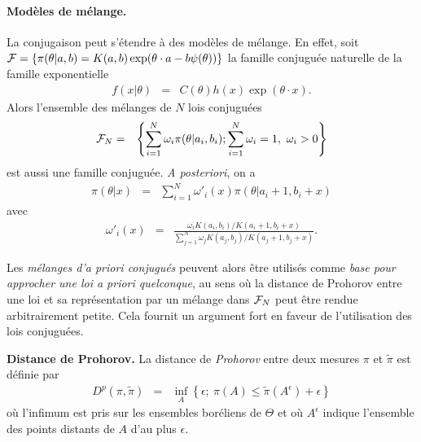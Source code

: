 \if{} \vspace{1cm} 
\fi
\vspace{0.5cm}

\paragraph{\bf Modèles de mélange.} La conjugaison peut s'étendre à des modèles de mélange. En effet, soit ${\cal{F}}=\{\pi(\theta|a,b)=K(a,b)\exp(\theta\cdot a - b\psi(\theta))\}$  la famille conjuguée naturelle de la famille exponentielle
\begin{eqnarray*}
f(x|\theta) & = & C(\theta)h(x)\exp(\theta\cdot x).
\end{eqnarray*}
Alors l'ensemble des mélanges de $N$ lois conjuguées
\begin{eqnarray*}
{\cal{F}}_N & = & \left\{\sum\limits_{i=1}^N \omega_i\pi(\theta|a_i,b_i); \sum\limits_{i=1}^N \omega_i=1, \ \omega_i>0\right\}
\end{eqnarray*}
est aussi une famille conjuguée.  
{\it A posteriori}, on a
\begin{eqnarray*}
\pi(\theta|x) & = & \sum\limits_{i=1}^N \omega'_i(x)\pi(\theta|a_i+1,b_i+x)
\end{eqnarray*}
avec
\begin{eqnarray*}
\omega'_i(x) & = & \frac{\omega_i K(a_i,b_i)/K(a_i+1,b_i+x)}{\sum_{j=1}^N \omega_j K(a_j,b_j)/K(a_j+1,b_j+x)}. 
\end{eqnarray*}


Les \emph{mélanges d'{\it a priori} conjugués} peuvent alors \^etre utilisés comme \emph{base pour approcher une loi {\it a priori} quelconque}, au sens où la distance de Prohorov entre une loi  et sa représentation par un mélange dans ${\cal{F}}_N$ peut \^etre rendue arbitrairement petite. Cela fournit un argument fort en faveur de l'utilisation des lois conjuguées. 

\begin{definition}{\bf Distance de Prohorov.}
La distance de \emph{Prohorov} entre deux mesures $\pi$ et $\tilde{\pi}$ est définie par
\begin{eqnarray*}
D^p(\pi,\tilde{\pi}) & = & \inf\limits_{A}\left\{ \epsilon ; \ \pi(A)\leq \tilde{\pi}(A^{\epsilon}) + \epsilon\right\}
\end{eqnarray*}
où l'infimum est pris sur les ensembles boréliens de $\Theta$ et où $A^{\epsilon}$ indique l'ensemble des points distants de $A$ d'au plus $\epsilon$.
\end{definition}

